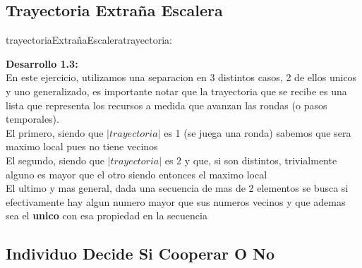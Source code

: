 \documentclass[10pt,a4paper]{article}
\begin{document}
\subsection{Trayectoria Extraña Escalera}

\begin{proc}{trayectoriaExtrañaEscalera}{\In trayectoria: \TLista{\float}}{\bool}
    
	

\textbf{Desarrollo 1.3:}
\\
En este ejercicio, utilizamos una separacion en 3 distintos casos, 2 de ellos unicos y uno generalizado, es importante notar que la trayectoria que se recibe es una lista que representa los recursos a medida que avanzan las rondas (o pasos temporales).
\\ El primero, siendo que $|\textit{trayectoria}|$ es 1 (se juega una ronda) sabemos que sera maximo local pues no tiene vecinos
\\ El segundo, siendo que $|\textit{trayectoria}|$ es 2 y que, si son distintos, trivialmente alguno es mayor que el otro siendo entonces el maximo local
\\El ultimo y mas general, dada una secuencia de mas de 2 elementos se busca si efectivamente hay algun numero mayor que sus numeros vecinos y que ademas sea el \textbf{unico} con esa propiedad en la secuencia
\end{proc}

\subsection{Individuo Decide Si Cooperar O No}
\end{document}
